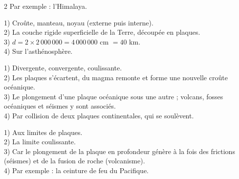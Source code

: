 \begin{multicols}{2}
Par exemple : l'Himalaya.

1) Croûte, manteau, noyau (externe puis interne).\\
2) La couche rigide superficielle de la Terre, découpée en plaques.\\
3) $d=2\times2\,000\,000=4\,000\,000$ cm $=40$ km.\\
4) Sur l'asthénosphère.

1) Divergente, convergente, coulissante.\\
2) Les plaques s'écartent, du magma remonte et forme une nouvelle croûte océanique.\\
3) Le plongement d'une plaque océanique sous une autre ; volcans, fosses océaniques et
séismes y sont associés.\\
4) Par collision de deux plaques continentales, qui se soulèvent.

1) Aux limites de plaques.\\
2) La limite coulissante.\\
3) Car le plongement de la plaque en profondeur génère à la fois des frictions
(séismes) et de la fusion de roche (volcanisme).\\
4) Par exemple : la ceinture de feu du Pacifique.

\end{multicols}
\exercicesBanner
